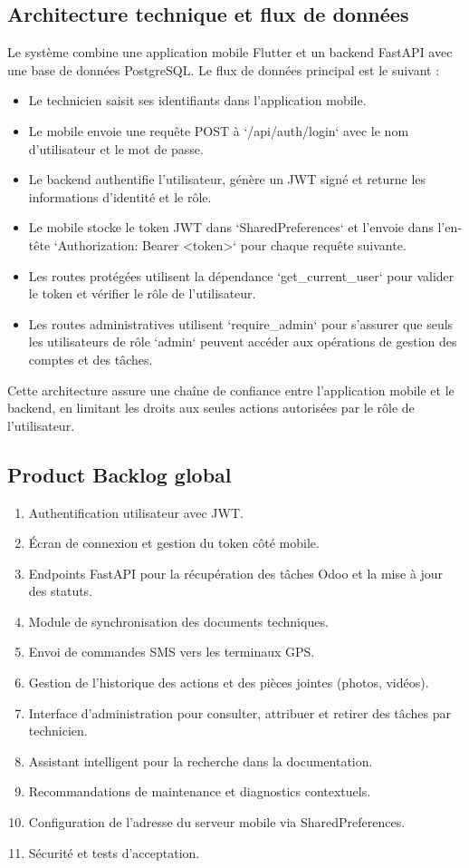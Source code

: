 \documentclass[12pt,a4paper]{report}
\begin{document}
\subsection{Architecture technique et flux de données}
\noindent Le système combine une application mobile Flutter et un backend FastAPI avec une base de données PostgreSQL. Le flux de données principal est le suivant :
\begin{itemize}
    \item Le technicien saisit ses identifiants dans l'application mobile.
    \item Le mobile envoie une requête POST à `/api/auth/login` avec le nom d'utilisateur et le mot de passe.
    \item Le backend authentifie l'utilisateur, génère un JWT signé et returne les informations d'identité et le rôle.
    \item Le mobile stocke le token JWT dans `SharedPreferences` et l'envoie dans l'en-tête `Authorization: Bearer <token>` pour chaque requête suivante.
    \item Les routes protégées utilisent la dépendance `get_current_user` pour valider le token et vérifier le rôle de l'utilisateur.
    \item Les routes administratives utilisent `require_admin` pour s'assurer que seuls les utilisateurs de rôle `admin` peuvent accéder aux opérations de gestion des comptes et des tâches.
\end{itemize}
\noindent Cette architecture assure une chaîne de confiance entre l'application mobile et le backend, en limitant les droits aux seules actions autorisées par le rôle de l'utilisateur.

\subsection{Product Backlog global}
\begin{enumerate}
    \item Authentification utilisateur avec JWT.
    \item Écran de connexion et gestion du token côté mobile.
    \item Endpoints FastAPI pour la récupération des tâches Odoo et la mise à jour des statuts.
    \item Module de synchronisation des documents techniques.
    \item Envoi de commandes SMS vers les terminaux GPS.
    \item Gestion de l'historique des actions et des pièces jointes (photos, vidéos).
    \item Interface d'administration pour consulter, attribuer et retirer des tâches par technicien.
    \item Assistant intelligent pour la recherche dans la documentation.
    \item Recommandations de maintenance et diagnostics contextuels.
    \item Configuration de l'adresse du serveur mobile via SharedPreferences.
    \item Sécurité et tests d'acceptation.
\end{enumerate}
\end{document}
